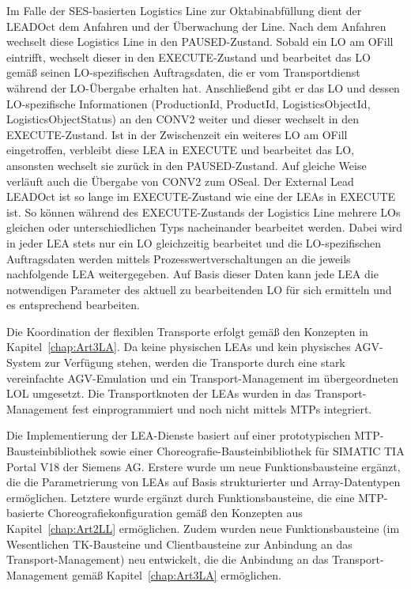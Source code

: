 Im Falle der SES-basierten Logistics Line zur Oktabinabfüllung dient der LEAD\-Oct dem Anfahren und der Überwachung der Line. Nach dem Anfahren wechselt diese Logistics Line in den PAUSED-Zustand. Sobald ein LO am OFill eintrifft, wechselt dieser in den EXECUTE-Zustand und bearbeitet das LO gemäß seinen LO-spezifischen Auftragsdaten, die er vom Transportdienst während der LO-Übergabe erhalten hat. Anschließend gibt er das LO und dessen LO-spezifische Informationen (ProductionId, ProductId, LogisticsObjectId, LogisticsObjectStatus) an den CONV2 weiter und dieser wechselt in den EXECUTE-Zustand. Ist in der Zwischenzeit ein weiteres LO am OFill eingetroffen, verbleibt diese LEA in EXECUTE und bearbeitet das LO, ansonsten wechselt sie zurück in den PAUSED-Zustand. Auf gleiche Weise verläuft auch die Übergabe von CONV2 zum OSeal. Der External Lead LEADOct ist so lange im EXECUTE-Zustand wie eine der LEAs in EXECUTE ist. So können während des EXECUTE-Zustands der Logistics Line mehrere LOs gleichen oder unterschiedlichen Typs nacheinander bearbeitet werden. Dabei wird in jeder LEA stets nur ein LO gleichzeitig bearbeitet und die LO-spezifischen Auftragsdaten werden mittels Prozesswertverschaltungen an die jeweils nachfolgende LEA weitergegeben. Auf Basis dieser Daten kann jede LEA die notwendigen Parameter des aktuell zu bearbeitenden LO für sich ermitteln und es entsprechend bearbeiten.

Die Koordination der flexiblen Transporte erfolgt gemäß den Konzepten in Kapitel~\ref{chap:Art3LA}. Da keine physischen LEAs und kein physisches AGV-System zur Verfügung stehen, werden die Transporte durch eine stark vereinfachte AGV-Emulation und ein Transport-Management im übergeordneten LOL umgesetzt. Die Transportknoten der LEAs wurden in das Transport-Management fest einprogrammiert und noch nicht mittels MTPs integriert.

Die Implementierung der LEA-Dienste basiert auf einer prototypischen MTP-Bausteinbibliothek sowie einer Choreografie-Bausteinbibliothek für SIMATIC TIA Portal V18 der Siemens AG. Erstere wurde um neue Funktionsbausteine ergänzt, die die Parametrierung von LEAs auf Basis strukturierter und Array-Datentypen ermöglichen. Letztere wurde ergänzt durch Funktionsbausteine, die eine MTP-ba\-sier\-te Choreografiekonfiguration gemäß den Konzepten aus Kapitel~\ref{chap:Art2LL} ermöglichen. Zudem wurden neue Funktionsbausteine (im Wesentlichen TK-Bausteine und Clientbausteine zur Anbindung an das Transport-Management) neu entwickelt, die die Anbindung an das Transport-Management gemäß Kapitel~\ref{chap:Art3LA} ermöglichen.

